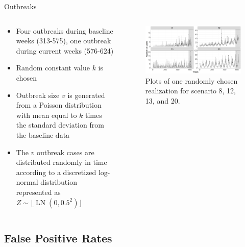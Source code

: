 \documentclass[aspectratio=169]{beamer}
\DeclareMathOperator{\LN}{LN}
\begin{document}
\begin{frame}{Outbreaks}
\begin{columns}
\begin{column}{.50\textwidth}
\begin{itemize}
  \item Four outbreaks during baseline weeks (313-575), one outbreak during current weeks (576-624)
  \item Random constant value $k$ is chosen
  \item Outbreak size $v$ is generated from a Poisson distribution with mean equal to $k$ times the standard deviation from the baseline data
  \item The $v$ outbreak cases are distributed randomly in time according to a discretized log-normal distribution represented as $Z \sim \lfloor \LN(0,0.5^2)\rfloor$
\end{itemize}
\end{column}
\hfill
\begin{column}{.46\textwidth}

 \tiny

\begin{figure}[H]
\includegraphics[width=1\linewidth]{../figures/Realizations} \caption{Plots of one randomly chosen realization for scenario 8, 12, 13, and 20.}\label{fig:Realizations}
\end{figure}

 \normalsize
\end{column}
\end{columns}
\end{frame}

\hypertarget{false-positive-rates}{%
\subsection{False Positive Rates}\label{false-positive-rates}}
\end{document}

